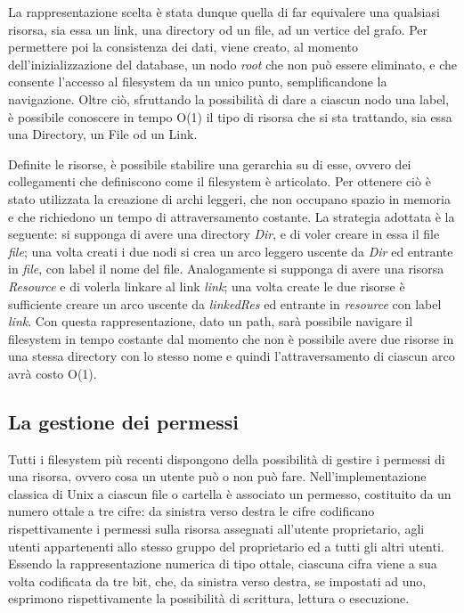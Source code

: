  La rappresentazione scelta è stata dunque quella di far equivalere una qualsiasi risorsa, sia essa un link, una directory od un file, ad un vertice del grafo. Per permettere poi la consistenza dei dati, viene creato, al momento dell'inizializzazione del database, un nodo \emph{root} che non può essere eliminato, e che consente l'accesso al filesystem da un unico punto, semplificandone la navigazione. Oltre ciò, sfruttando la possibilità di dare a ciascun nodo una label, è possibile conoscere in tempo O(1) il tipo di risorsa che si sta trattando, sia essa una Directory, un File od un Link.
 
 Definite le risorse, è possibile stabilire una gerarchia su di esse, ovvero dei collegamenti che definiscono come il filesystem è articolato. Per ottenere ciò è stato utilizzata la creazione di archi leggeri, che non occupano spazio in memoria e che richiedono un tempo di attraversamento costante. La strategia adottata è la seguente: si supponga di avere una directory \emph{Dir}, e di voler creare in essa il file \emph{file}; una volta creati i due nodi si crea un arco leggero uscente da \emph{Dir} ed entrante in \emph{file}, con label il nome del file. Analogamente si supponga di avere una risorsa \emph{Resource} e di volerla linkare al link \emph{link}; una volta create le due risorse è sufficiente creare un arco uscente da \emph{linkedRes} ed entrante in \emph{resource} con label \emph{link}. Con questa rappresentazione, dato un path, sarà possibile navigare il filesystem in tempo costante dal momento che non è possibile avere due risorse in una stessa directory con lo stesso nome e quindi l'attraversamento di ciascun arco avrà costo O(1).
 
 \subsection{La gestione dei permessi}
 Tutti i filesystem più recenti dispongono della possibilità di gestire i permessi di una risorsa, ovvero cosa un utente può o non può fare. Nell'implementazione classica di Unix a ciascun file o cartella è associato un permesso, costituito da un numero ottale a tre cifre: da sinistra verso destra le cifre codificano rispettivamente i permessi sulla risorsa assegnati all'utente proprietario, agli utenti appartenenti allo stesso gruppo del proprietario ed a tutti gli altri utenti. Essendo la rappresentazione numerica di tipo ottale, ciascuna cifra viene a sua volta codificata da tre bit, che, da sinistra verso destra, se impostati ad uno, esprimono rispettivamente la possibilità di scrittura, lettura o esecuzione.
 
